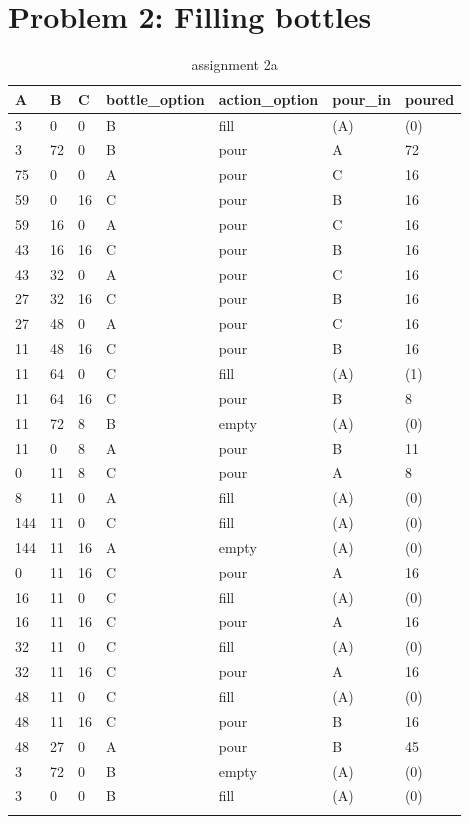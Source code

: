 \documentclass[a4paper]{article}
\begin{document}
	\section*{Problem 2: Filling bottles}
	\begin{longtable}[c]{@{}lllllll@{}}
		\toprule
		A & B & C & bottle\_option & action\_option & pour\_in &
		poured\tabularnewline
		\midrule
		\endhead
		3 & 0 & 0 & B & fill & (A) & (0)\tabularnewline
		3 & 72 & 0 & B & pour & A & 72\tabularnewline
		75 & 0 & 0 & A & pour & C & 16\tabularnewline
		59 & 0 & 16 & C & pour & B & 16\tabularnewline
		59 & 16 & 0 & A & pour & C & 16\tabularnewline
		43 & 16 & 16 & C & pour & B & 16\tabularnewline
		43 & 32 & 0 & A & pour & C & 16\tabularnewline
		27 & 32 & 16 & C & pour & B & 16\tabularnewline
		27 & 48 & 0 & A & pour & C & 16\tabularnewline
		11 & 48 & 16 & C & pour & B & 16\tabularnewline
		11 & 64 & 0 & C & fill & (A) & (1)\tabularnewline
		11 & 64 & 16 & C & pour & B & 8\tabularnewline
		11 & 72 & 8 & B & empty & (A) & (0)\tabularnewline
		11 & 0 & 8 & A & pour & B & 11\tabularnewline
		0 & 11 & 8 & C & pour & A & 8\tabularnewline
		8 & 11 & 0 & A & fill & (A) & (0)\tabularnewline
		144 & 11 & 0 & C & fill & (A) & (0)\tabularnewline
		144 & 11 & 16 & A & empty & (A) & (0)\tabularnewline
		0 & 11 & 16 & C & pour & A & 16\tabularnewline
		16 & 11 & 0 & C & fill & (A) & (0)\tabularnewline
		16 & 11 & 16 & C & pour & A & 16\tabularnewline
		32 & 11 & 0 & C & fill & (A) & (0)\tabularnewline
		32 & 11 & 16 & C & pour & A & 16\tabularnewline
		48 & 11 & 0 & C & fill & (A) & (0)\tabularnewline
		48 & 11 & 16 & C & pour & B & 16\tabularnewline
		48 & 27 & 0 & A & pour & B & 45\tabularnewline
		3 & 72 & 0 & B & empty & (A) & (0)\tabularnewline
		3 & 0 & 0 & B & fill & (A) & (0)\tabularnewline
		\bottomrule
		\caption{assignment 2a}
		\label{tab:2a}
	\end{longtable}
	
\end{document}
